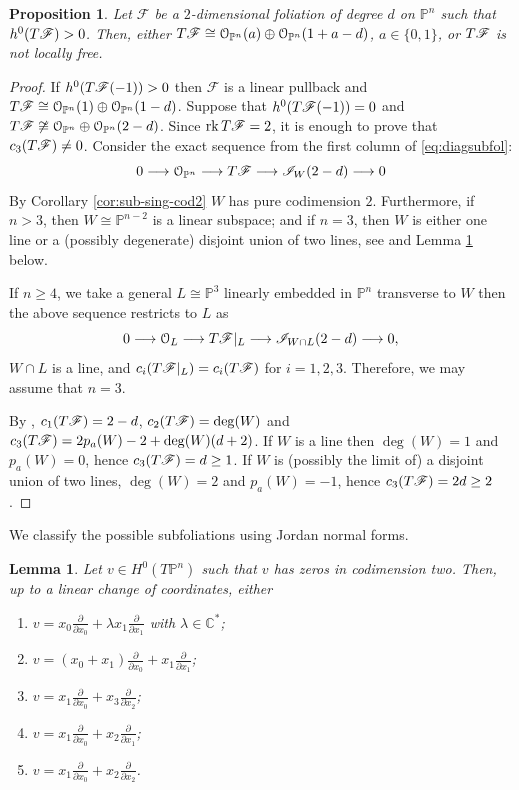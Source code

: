\documentclass[twoside]{amsart}
\numberwithin{equation}{section}
\newcommand{\p}[1]{{\mathbb{P}^{#1}}}
\newcommand{\opn}{{\mathcal O}_{\mathbb{P}^{n}}}
\newcommand{\pn}{{\mathbb{P}^{n}}}
\newcommand{\tpn}{T{\mathbb{P}^{n}}}
\newcommand{\sI}{\mathscr{I}}
\DeclareMathOperator{\rk}{rk}
\def\OO{\mathcal{O}}
\newcommand{\sF}{\mathscr{F}}
\newcommand{\sG}{\mathscr{G}}
\newcommand{\tF}{{\rm T}\sF}
\newcommand{\lra}{ \longrightarrow }
\newcommand{\del}[1]{\frac{\partial}{\partial #1}}
\newtheorem{proposition}[theorem]{Proposition}
\newtheorem{lemma}[theorem]{Lemma}
\theoremstyle{definition}
\begin{document}

\begin{proposition}\label{prop:nonsplit}
Let $\sF$ be a $2$-dimensional foliation of degree $d$ on $\pn$ such that $h^0(\tF)>0$. Then, either $\tF\cong \opn(a)\oplus \opn(1+a-d)$, $a\in\{0,1\}$, or $\tF$ is not locally free. 
\end{proposition}

\begin{proof}
If $h^0(\tF(-1))>0$ then $\sF$ is a linear pullback and $\tF \cong \opn(1)\oplus \opn(1-d)$. Suppose that $h^0(\tF(-1)) = 0$ and $\tF \not\cong \opn \oplus \opn(2-d)$. Since $\rk \tF = 2$, it is enough to prove that $c_3(\tF) \neq 0$. Consider the exact sequence from the first column of \eqref{eq:diagsubfol}:
\[
0  \lra  \opn  \lra  \tF  \lra  \sI_W(2-d)  \lra  0
\]
By Corollary \ref{cor:sub-sing-cod2} $W$ has pure codimension $2$. Furthermore, if $n>3$, then $W\cong \p{n-2}$ is a linear subspace; and if $n=3$, then $W$ is either one line or a (possibly degenerate) disjoint union of two lines, see \cite[\S2.3]{GJM} and Lemma \ref{lem:veccd2} below. 

If $n\geq 4$, we take a general $L \cong \p3$ linearly embedded in $\pn$ transverse to $W$ then the above sequence restricts to $L$ as
\[
0  \lra  \OO_L  \lra  \tF|_L  \lra  \sI_{W\cap L}(2-d)  \lra  0,
\]
$W\cap L$ is a line, and  $c_i(\tF|_L) = c_i(\tF)$ for $i = 1,2,3$. Therefore, we may assume that $n=3$. 

By \cite[Theorem 4.1]{H2}, $c_1(\tF) = 2-d$, $c_2(\tF) = \deg( W)$ and $c_3(\tF) = 2p_a(W)-2 + \deg(W)(d+2)$. If $W$ is a line then $\deg(W) = 1$ and $p_a(W) = 0$, hence $c_3(\tF) = d \geq 1$. If $W$ is (possibly the limit of) a disjoint union of two lines, $\deg(W) = 2$ and $p_a(W) = -1$, hence $c_3(\tF) = 2d\geq 2$. 
\end{proof}

We classify the possible subfoliations using Jordan normal forms.

\begin{lemma}\label{lem:veccd2}
Let $v\in H^0(\tpn)$ such that $v$ has zeros in codimension two. Then, up to a linear change of coordinates, either
\begin{enumerate}
 \item $v = x_0\del{ x_0} + \lambda x_1\del{ x_1}$ with $\lambda \in \mathbb{C}^*$; 
 \item $v = (x_0+ x_1)\del{ x_0} + x_1\del{ x_1}$;
 \item $v = x_1\del{ x_0} + x_3\del{ x_2}$;
 \item $v = x_1\del{ x_0} + x_2\del{ x_1}$;
 \item { $v = x_1\del{ x_0} + x_2\del{ x_2}$.} 
\end{enumerate}
\end{lemma}
\end{document}
